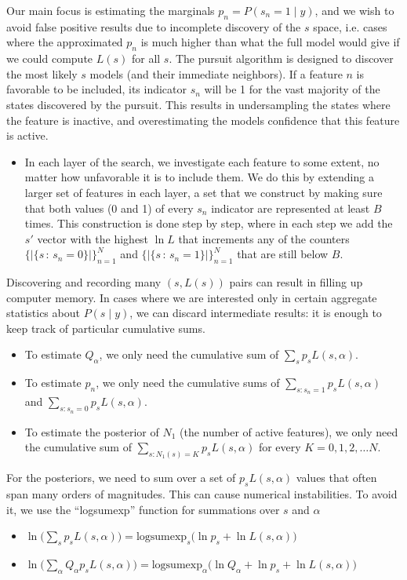 \documentclass[letter,10pt,oneside]{article}
\newcommand{\+}{^\dagger}
\begin{document}
Our main focus is estimating the marginals $p_n = P(s_n = 1\;|\;y)$, and we wish to avoid false positive results due to incomplete discovery of the $s$ space, i.e. cases where the approximated $p_n$ is much higher than what the full model would give if we could compute $L(s)$ for all $s$. The pursuit algorithm is designed to discover the most likely $s$ models (and their immediate neighbors). If a feature $n$ is favorable to be included, its indicator $s_n$ will be 1 for the vast majority of the states discovered by the pursuit. This results in undersampling the states where the feature is inactive, and overestimating the models confidence that this feature is active.
\begin{itemize}
  \item In each layer of the search, we investigate each feature to some extent, no matter how unfavorable it is to include them. We do this by extending a larger set of features in each layer, a set that we construct by making sure that both values (0 and 1) of every $s_n$ indicator are represented at least $B$ times. This construction is done step by step, where in each step we add the $s'$ vector with the highest $\ln L$ that increments any of the counters $\{|\{s\,:\, s_n=0\}|\}_{n=1}^N$ and $\{|\{s\,:\, s_n=1\}|\}_{n=1}^N$ that are still below $B$.
\end{itemize}

Discovering and recording many $(s, L(s))$ pairs can result in filling up computer memory. In cases where we are interested only in certain aggregate statistics about $P(s\;|\;y)$, we can discard intermediate results: it is enough to keep track of particular cumulative sums.
\begin{itemize}
  \item To estimate $Q_\alpha$, we only need the cumulative sum of $\sum_s p_s L(s, \alpha)$.
  \item To estimate $p_n$, we only need the cumulative sums of $\sum_{s: s_n =  1} p_s L(s, \alpha)$ and $\sum_{s: s_n=0} p_s L(s, \alpha)$.
  \item To estimate the posterior of $N_1$ (the number of active features), we only need the cumulative sum of $\sum_{s: N_1(s) = K} p_s L(s, \alpha)$ for every $K=0,1,2,\ldots N$.
\end{itemize}

For the posteriors, we need to sum over a set of $p_s L(s, \alpha)$ values that often span many orders of magnitudes. This can cause numerical instabilities. To avoid it, we use the ``logsumexp'' function for summations over $s$ and $\alpha$
\begin{itemize}
  \item $\ln\Big(\sum_s p_s L(s, \alpha)\Big) = \text{logsumexp}_s\Big(\ln p_s + \ln L(s, \alpha)\Big)$
  \item $\ln \Big(\sum_\alpha Q_\alpha p_s L(s,\alpha)\Big) = \text{logsumexp}_\alpha\Big(\ln Q_\alpha + \ln p_s + \ln L(s, \alpha)\Big)$
\end{itemize}
\end{document}

